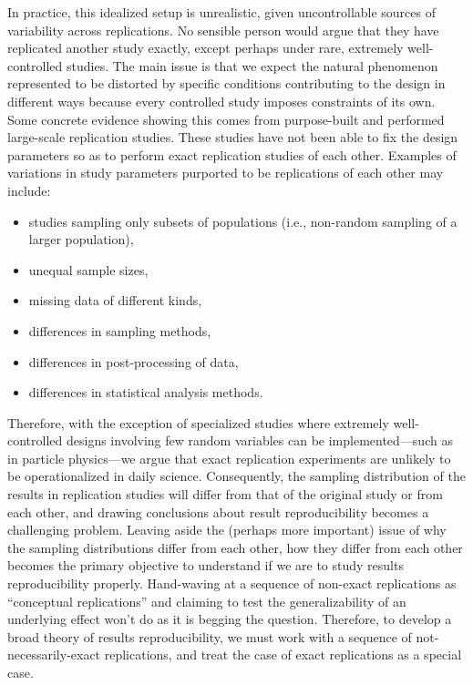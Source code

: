 \documentclass[meta,authordate]{jote-new-article}
\newcounter{result}
\begin{document}
In practice, this idealized setup is unrealistic, given uncontrollable sources of variability across replications. No sensible person would argue that they have replicated another study exactly, except perhaps under rare, extremely well-controlled studies. The main issue is that we expect the natural phenomenon represented to be distorted by specific conditions contributing to the design in different ways because every controlled study imposes constraints of its own. Some concrete evidence showing this comes from purpose-built and performed large-scale replication studies. These studies have not been able to fix the design parameters so as to perform exact replication studies of each other. Examples of variations in study parameters purported to be replications of each other may include:
\newpage
\begin{itemize}
  \item studies sampling only subsets of populations (i.e., non-random sampling of a larger population),
  \item unequal sample sizes,
  \item missing data of different kinds,
  \item differences in sampling methods,
  \item differences in post-processing of data,
  \item differences in statistical analysis methods.
\end{itemize}
Therefore, with the exception of specialized studies where extremely well-controlled designs involving few random variables can be implemented---such as in particle physics---we argue that exact replication experiments are unlikely to be operationalized in daily science. Consequently, the sampling distribution of the results in replication studies will differ from that of the original study or from each other, and drawing conclusions about result reproducibility becomes a challenging problem. Leaving aside the (perhaps more important) issue of why the sampling distributions differ from each other, how they differ from each other becomes the primary objective to understand if we are to study results reproducibility properly. Hand-waving at a sequence of non-exact replications as ``conceptual replications'' and claiming to test the generalizability of an underlying effect won't do as it is begging the question. Therefore, to develop a broad theory of results reproducibility, we must work with a sequence of not-necessarily-exact replications, and treat the case of exact replications as a special case.
\end{document}
